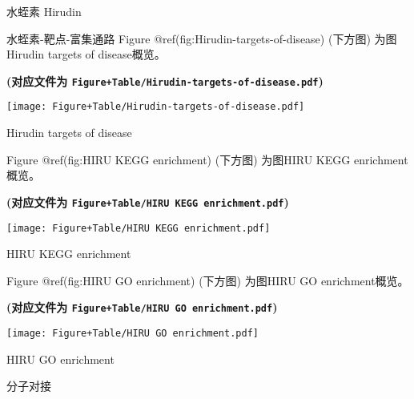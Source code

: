 \documentclass[
  ignorenonframetext,
]{beamer}
\begin{document}
\begin{frame}[fragile]{水蛭素 Hirudin}
\protect\hypertarget{ux6c34ux86edux7d20-hirudin}{}
\begin{block}{水蛭素-靶点-富集通路}
\protect\hypertarget{ux6c34ux86edux7d20-ux9776ux70b9-ux5bccux96c6ux901aux8def}{}
Figure @ref(fig:Hirudin-targets-of-disease) (下方图) 为图Hirudin targets
of disease概览。

\textbf{(对应文件为
\texttt{Figure+Table/Hirudin-targets-of-disease.pdf})}

\def\@captype{figure}
\begin{center}
\texttt{[image: Figure+Table/Hirudin-targets-of-disease.pdf]}
\caption{Hirudin targets of disease}\label{fig:Hirudin-targets-of-disease}
\end{center}

Figure @ref(fig:HIRU KEGG enrichment) (下方图) 为图HIRU KEGG
enrichment概览。

\textbf{(对应文件为 \texttt{Figure+Table/HIRU\ KEGG\ enrichment.pdf})}

\def\@captype{figure}
\begin{center}
\texttt{[image: Figure+Table/HIRU KEGG enrichment.pdf]}
\caption{HIRU KEGG enrichment}\label{fig:HIRU KEGG enrichment}
\end{center}

Figure @ref(fig:HIRU GO enrichment) (下方图) 为图HIRU GO
enrichment概览。

\textbf{(对应文件为 \texttt{Figure+Table/HIRU\ GO\ enrichment.pdf})}

\def\@captype{figure}
\begin{center}
\texttt{[image: Figure+Table/HIRU GO enrichment.pdf]}
\caption{HIRU GO enrichment}\label{fig:HIRU GO enrichment}
\end{center}
\end{block}

\begin{block}{分子对接}
\protect\hypertarget{ux5206ux5b50ux5bf9ux63a5}{}
\end{block}
\end{frame}
\end{document}
